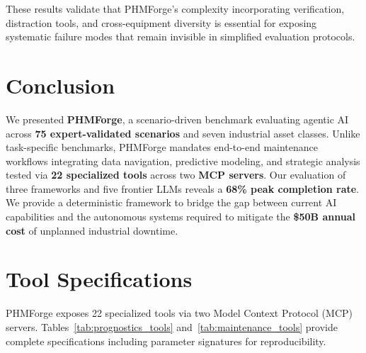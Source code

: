 \documentclass[sigconf,review]{acmart}
\begin{document}
These results validate that PHMForge's complexity incorporating verification, distraction tools, and cross-equipment diversity is essential for exposing systematic failure modes that remain invisible in simplified evaluation protocols.

\section{Conclusion}
We presented \textbf{PHMForge}, a scenario-driven benchmark evaluating agentic AI across \textbf{75 expert-validated scenarios} and seven industrial asset classes. Unlike task-specific benchmarks, PHMForge mandates end-to-end maintenance workflows integrating data navigation, predictive modeling, and strategic analysis tested via \textbf{22 specialized tools} across two \textbf{MCP servers}. Our evaluation of three frameworks and five frontier LLMs reveals a \textbf{68\% peak completion rate}. We provide a deterministic framework to bridge the gap between current AI capabilities and the autonomous systems required to mitigate the \textbf{\$50B annual cost} of unplanned industrial downtime.







\appendix

\section{Tool Specifications}
\label{app:tools}

PHMForge exposes 22 specialized tools via two Model Context Protocol (MCP) servers. Tables~\ref{tab:prognostics_tools} and~\ref{tab:maintenance_tools} provide complete specifications including parameter signatures for reproducibility.
\end{document}
